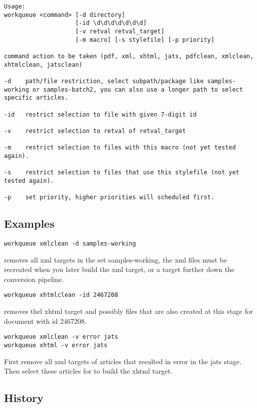 \documentclass[a4paper]{article}
\begin{document}
\begin{verbatim}
Usage:
workqueue <command> [-d directory]
                    [-id \d\d\d\d\d\d\d]
                    [-v retval retval_target]
                    [-m macro] [-s stylefile] [-p priority]

command action to be taken (pdf, xml, xhtml, jats, pdfclean, xmlclean, xhtmlclean, jatsclean)

-d    path/file restriction, select subpath/package like samples-working or samples-batch2, you can also use a longer path to select specific articles.

-id   restrict selection to file with given 7-digit id

-v    restrict selection to retval of retval_target

-m    restrict selection to files with this macro (not yet tested again).

-s    restrict selection to files that use this stylefile (not yet tested again).

-p    set priority, higher priorities will scheduled first.
\end{verbatim}

\subsection{Examples}

\begin{verbatim}
workqueue xmlclean -d samples-working
\end{verbatim}
removes all xml targets in the set samples-working, the xml files must be recreated when you later build the xml target, or a target further down the conversion pipeline.

\begin{verbatim}
workqueue xhtmlclean -id 2467208
\end{verbatim}
removes thel xhtml target and possibly files that are also created at this stage for document with id  2467208.

\begin{verbatim}
workqueue xmlclean -v error jats
workqueue xhtml -v error jats
\end{verbatim}
First remove all xml targets of articles that resulted in error in the jats stage.\\
Then select these articles for to build the xhtml target.

\subsection{History}
\end{document}
